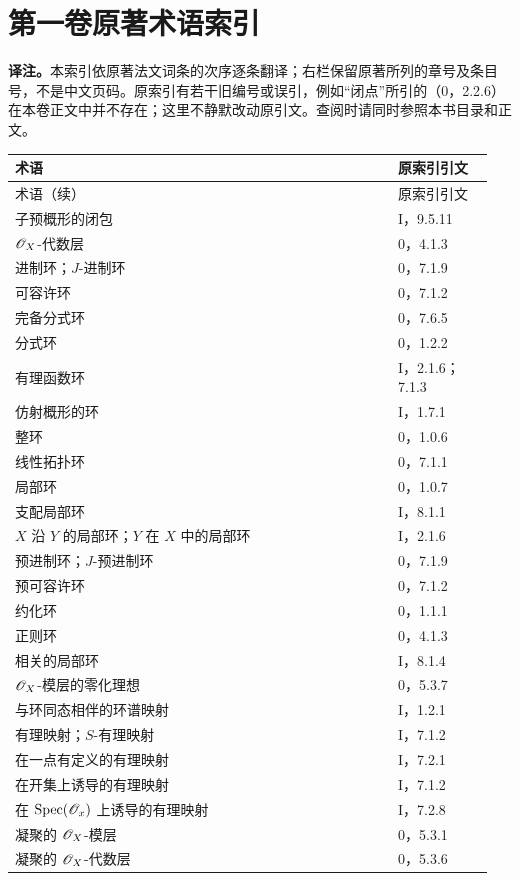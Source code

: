 \chapter*{第一卷原著术语索引}
\noindent\textbf{译注。}本索引依原著法文词条的次序逐条翻译；右栏保留原著所列的章号及条目号，不是中文页码。原索引有若干旧编号或误引，例如“闭点”所引的（0，2.2.6）在本卷正文中并不存在；这里不静默改动原引文。查阅时请同时参照本书目录和正文。
\begingroup\small
\renewcommand{\arraystretch}{1.16}
\begin{longtable}{@{}p{0.76\linewidth}p{0.19\linewidth}@{}}
\toprule 术语&原索引引文\\\midrule\endfirsthead
\toprule 术语（续）&原索引引文\\\midrule\endhead
\bottomrule\endfoot
子预概形的闭包&I，9.5.11\\
$\mathscr O_X$-代数层&0，4.1.3\\
进制环；$J$-进制环&0，7.1.9\\
可容许环&0，7.1.2\\
完备分式环&0，7.6.5\\
分式环&0，1.2.2\\
有理函数环&I，2.1.6；7.1.3\\
仿射概形的环&I，1.7.1\\
整环&0，1.0.6\\
线性拓扑环&0，7.1.1\\
局部环&0，1.0.7\\
支配局部环&I，8.1.1\\
$X$ 沿 $Y$ 的局部环；$Y$ 在 $X$ 中的局部环&I，2.1.6\\
预进制环；$J$-预进制环&0，7.1.9\\
预可容许环&0，7.1.2\\
约化环&0，1.1.1\\
正则环&0，4.1.3\\
相关的局部环&I，8.1.4\\
$\mathscr O_X$-模层的零化理想&0，5.3.7\\
与环同态相伴的环谱映射&I，1.2.1\\
有理映射；$S$-有理映射&I，7.1.2\\
在一点有定义的有理映射&I，7.2.1\\
在开集上诱导的有理映射&I，7.1.2\\
在 $\operatorname{Spec}(\mathscr O_x)$ 上诱导的有理映射&I，7.2.8\\
凝聚的 $\mathscr O_X$-模层&0，5.3.1\\
凝聚的 $\mathscr O_X$-代数层&0，5.3.6\\

\end{longtable}
